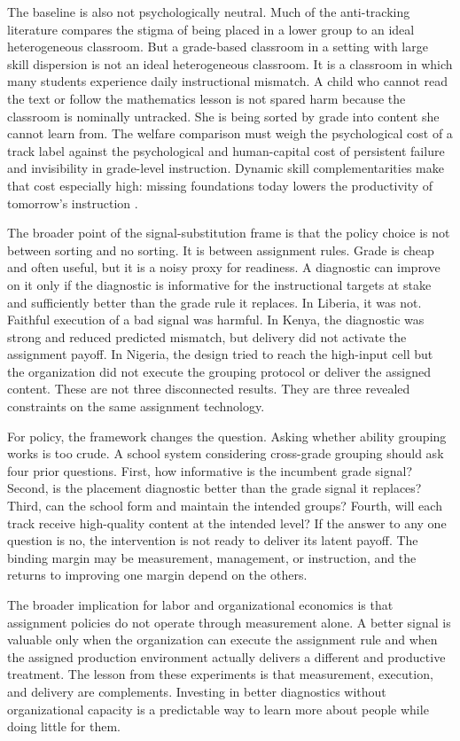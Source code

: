 \documentclass[11pt]{article}
\begin{document}
The baseline is also not psychologically neutral. Much of the anti-tracking literature compares the stigma of being placed in a lower group to an ideal heterogeneous classroom. But a grade-based classroom in a setting with large skill dispersion is not an ideal heterogeneous classroom. It is a classroom in which many students experience daily instructional mismatch. A child who cannot read the text or follow the mathematics lesson is not spared harm because the classroom is nominally untracked. She is being sorted by grade into content she cannot learn from. The welfare comparison must weigh the psychological cost of a track label against the psychological and human-capital cost of persistent failure and invisibility in grade-level instruction. Dynamic skill complementarities make that cost especially high: missing foundations today lowers the productivity of tomorrow's instruction \citep{cunhaheckman2007}.

The broader point of the signal-substitution frame is that the policy choice is not between sorting and no sorting. It is between assignment rules. Grade is cheap and often useful, but it is a noisy proxy for readiness. A diagnostic can improve on it only if the diagnostic is informative for the instructional targets at stake and sufficiently better than the grade rule it replaces. In Liberia, it was not. Faithful execution of a bad signal was harmful. In Kenya, the diagnostic was strong and reduced predicted mismatch, but delivery did not activate the assignment payoff. In Nigeria, the design tried to reach the high-input cell but the organization did not execute the grouping protocol or deliver the assigned content. These are not three disconnected results. They are three revealed constraints on the same assignment technology.

For policy, the framework changes the question. Asking whether ability grouping works is too crude. A school system considering cross-grade grouping should ask four prior questions. First, how informative is the incumbent grade signal? Second, is the placement diagnostic better than the grade signal it replaces? Third, can the school form and maintain the intended groups? Fourth, will each track receive high-quality content at the intended level? If the answer to any one question is no, the intervention is not ready to deliver its latent payoff. The binding margin may be measurement, management, or instruction, and the returns to improving one margin depend on the others.

The broader implication for labor and organizational economics is that assignment policies do not operate through measurement alone. A better signal is valuable only when the organization can execute the assignment rule and when the assigned production environment actually delivers a different and productive treatment. The lesson from these experiments is that measurement, execution, and delivery are complements. Investing in better diagnostics without organizational capacity is a predictable way to learn more about people while doing little for them.
\end{document}
